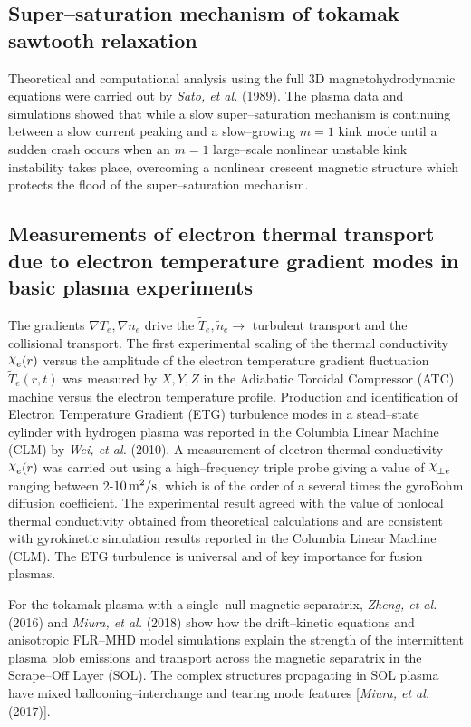 \documentclass[a4paper,openany,12pt]{book}
\def\chix{\raise.5ex\hbox{$\chi$}}
\begin{document}
\subsection{Super--saturation mechanism of tokamak sawtooth relaxation}

Theoretical and computational analysis using the full 3D magnetohydrodynamic equations were carried out by \emph{Sato, et al.} (1989). The plasma data and simulations showed that while a slow super--saturation mechanism is continuing between a slow current peaking and a slow--growing $m=1$ kink mode until a sudden crash occurs when an $m=1$ large--scale nonlinear unstable kink instability takes place, overcoming a nonlinear crescent magnetic structure which protects the flood of the super--saturation mechanism.

\subsection{Measurements of electron thermal transport due to electron temperature gradient modes in basic plasma experiments}

The gradients $\nabla T_e, \nabla n_e$ drive the $\widetilde T_e, \widetilde n_e\to$ turbulent transport and the collisional transport. The first experimental scaling of the thermal conductivity $\chix_e(r)$ versus the amplitude of the electron temperature gradient fluctuation $\widetilde T_e(r, t)$ was measured by $X, Y, Z$ in the Adiabatic Toroidal Compressor (ATC) machine versus the electron temperature profile. Production and identification of Electron Temperature Gradient (ETG) turbulence modes in a stead--state cylinder with hydrogen plasma was reported in the Columbia Linear Machine (CLM) by \emph{Wei, et al.} (2010). A measurement of electron thermal conductivity $\chix_e(r)$ was carried out using a high--frequency triple probe giving a value of $\chix_{\perp e}$ ranging between 2-$10\,\rm m^2/\rm s$, which is of the order of a several times the gyroBohm diffusion coefficient. The experimental result agreed with the value of nonlocal thermal conductivity obtained from theoretical calculations and are consistent with gyrokinetic simulation results reported in the Columbia Linear Machine (CLM). The ETG turbulence is universal and of key importance for fusion plasmas.

For the tokamak plasma with a single--null magnetic separatrix, \emph{Zheng, et al.} (2016) and \emph{Miura, et al.} (2018) show how the drift--kinetic equations and anisotropic FLR--MHD model simulations explain the strength of the intermittent plasma blob emissions and transport across the magnetic separatrix in the Scrape--Off Layer (SOL). The complex structures propagating in SOL plasma have mixed ballooning--interchange and tearing mode features [\emph{Miura, et al.} (2017)].
\end{document}
